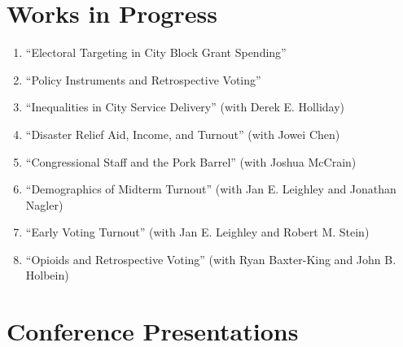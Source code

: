 \documentclass[12pt]{article}
\begin{document}


	
\section*{Works in Progress}

\begin{enumerate}[topsep = 0pt, itemsep = 1ex, partopsep  = 1ex, parsep = 1ex]

	\item[] ``Electoral Targeting in City Block Grant Spending''

	\item[] ``Policy Instruments and Retrospective Voting''
	
	\item[] ``Inequalities in City Service Delivery'' (with Derek E. Holliday)
	
	\item[] ``Disaster Relief Aid, Income, and Turnout'' (with Jowei Chen)
	
	\item[] ``Congressional Staff and the Pork Barrel'' (with Joshua McCrain)
	
	\item[] ``Demographics of Midterm Turnout'' (with Jan E. Leighley and Jonathan Nagler)

	\item[] ``Early Voting Turnout'' (with Jan E. Leighley and Robert M. Stein)
	
	\item[] ``Opioids and Retrospective Voting'' (with Ryan Baxter-King and John B. Holbein)

\end{enumerate}

\section*{Conference Presentations}
\end{document}
